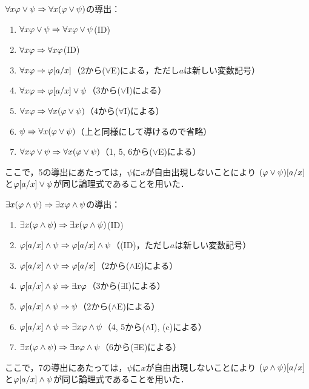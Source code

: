 \(\forall x \varphi \lor \psi \sequent \forall x \paren{\varphi \lor \psi}\)の導出：
\begin{enumerate}
	\item \(\forall x \varphi \lor \psi \Rightarrow \forall x \varphi \lor \psi\)\quad (ID)
	\item \(\forall x \varphi \Rightarrow \forall x \varphi\)\quad (ID)
	\item \(\forall x \varphi \sequent \subst{\varphi}{a/x}\)\quad （2から(\(\forall\)E)による，ただし\(a\)は新しい変数記号）
	\item \(\forall x \varphi \sequent \subst{\varphi}{a/x} \lor \psi\)\quad （3から(\(\lor\)I)による）
	\item \(\forall x \varphi \sequent \forall x \paren{\varphi \lor \psi}\)\quad （4から(\(\forall\)I)による）
	\item \(\psi \sequent \forall x \paren{\varphi \lor \psi}\)\quad （上と同様にして導けるので省略）
	\item \(\forall x \varphi \lor \psi \sequent \forall x \paren{\varphi \lor \psi}\)\quad （1, 5, 6から(\(\lor\)E)による）
\end{enumerate}
ここで，5の導出にあたっては，\(\psi\)に\(x\)が自由出現しないことにより
\(\subst{\paren{\varphi \lor \psi}}{a/x}\)と\(\subst{\varphi}{a/x} \lor \psi\)が同じ論理式であることを用いた．

\(\exists x \paren{\varphi \land \psi} \sequent \exists x \varphi \land \psi\)の導出：
\begin{enumerate}
	\item \(\exists x \paren{\varphi \land \psi} \sequent \exists x \paren{\varphi \land \psi}\)\quad (ID)
	\item \(\subst{\varphi}{a/x} \land \psi \sequent \subst{\varphi}{a/x} \land \psi\)\quad （(ID)，ただし\(a\)は新しい変数記号）
	\item \(\subst{\varphi}{a/x} \land \psi \sequent \subst{\varphi}{a/x}\)\quad （2から(\(\land\)E)による）
	\item \(\subst{\varphi}{a/x} \land \psi \sequent \exists x \varphi\)\quad （3から(\(\exists\)I)による）
	\item \(\subst{\varphi}{a/x} \land \psi \sequent \psi\)\quad （2から(\(\land\)E)による）
	\item \(\subst{\varphi}{a/x} \land \psi \sequent \exists x \varphi \land \psi\)\quad （4, 5から(\(\land\)I), (c)による）
	\item \(\exists x \paren{\varphi \land \psi} \sequent \exists x \varphi \land \psi\)\quad （6から(\(\exists\)E)による）
\end{enumerate}
ここで，7の導出にあたっては，\(\psi\)に\(x\)が自由出現しないことにより
\(\subst{\paren{\varphi \land \psi}}{a/x}\)と\(\subst{\varphi}{a/x} \land \psi\)が同じ論理式であることを用いた．

